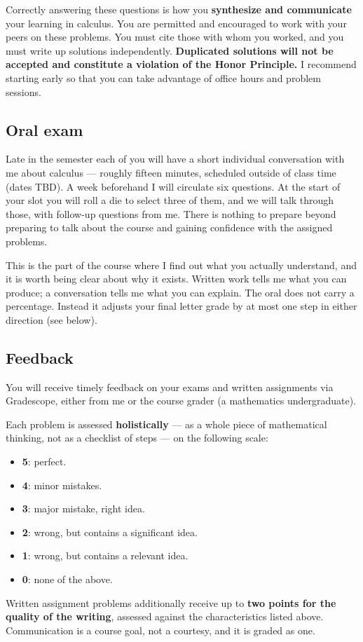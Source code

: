 \documentclass[11pt,twoside]{amsart}
\begin{document}
Correctly answering these questions is how you \textbf{synthesize and communicate} your learning in calculus. You are permitted and encouraged to work with your peers on these problems.  You must cite those with whom you worked, and you must write up solutions independently.  \textbf{Duplicated solutions will not be accepted and constitute a violation of the Honor Principle.} I recommend starting early so that you can take advantage of office hours and problem sessions.

\subsection*{Oral exam}
Late in the semester each of you will have a short individual conversation with me about calculus --- roughly fifteen minutes, scheduled outside of class time (dates TBD). A week beforehand I will circulate six questions. At the start of your slot you will roll a die to select three of them, and we will talk through those, with follow-up questions from me. There is nothing to prepare beyond preparing to talk about the course and gaining confidence with the assigned problems.

This is the part of the course where I find out what you actually understand, and it is worth being clear about why it exists. Written work tells me what you can produce; a conversation tells me what you can explain. The oral does not carry a percentage. Instead it adjusts your final letter grade by at most one step in either direction (see below).

\subsection*{Feedback}
You will receive timely feedback on your exams and written assignments via Gradescope, either from me or the course grader (a mathematics undergraduate).

Each problem is assessed \textbf{holistically} --- as a whole piece of mathematical thinking, not as a checklist of steps --- on the following scale:
\begin{itemize}
\item \textbf{5}: perfect.
\item \textbf{4}: minor mistakes.
\item \textbf{3}: major mistake, right idea.
\item \textbf{2}: wrong, but contains a significant idea.
\item \textbf{1}: wrong, but contains a relevant idea.
\item \textbf{0}: none of the above.
\end{itemize}
Written assignment problems additionally receive up to \textbf{two points for the quality of the writing}, assessed against the characteristics listed above. Communication is a course goal, not a courtesy, and it is graded as one.
\end{document}
